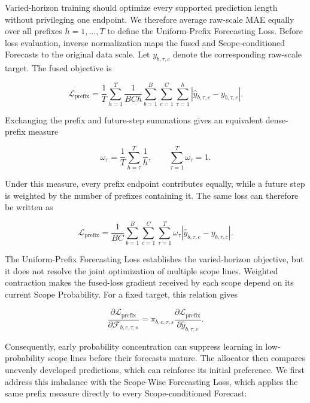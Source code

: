 \documentclass[final,3p,times]{elsarticle}
\begin{document}
Varied-horizon training should optimize every supported prediction length without privileging one endpoint. We therefore average raw-scale MAE equally over all prefixes $h=1,\ldots,T$ to define the Uniform-Prefix Forecasting Loss. Before loss evaluation, inverse normalization maps the fused and Scope-conditioned Forecasts to the original data scale. Let $y_{b,\tau,c}$ denote the corresponding raw-scale target. The fused objective is

\begin{equation}
\mathcal L_{\mathrm{prefix}}
=
\frac{1}{T}
\sum_{h=1}^{T}
\frac{1}{BCh}
\sum_{b=1}^{B}
\sum_{c=1}^{C}
\sum_{\tau=1}^{h}
\left|
\widehat y_{b,\tau,c}-y_{b,\tau,c}
\right|.
\end{equation}


Exchanging the prefix and future-step summations gives an equivalent dense-prefix measure

\begin{equation}
\omega_\tau
=
\frac{1}{T}
\sum_{h=\tau}^{T}
\frac{1}{h},
\qquad
\sum_{\tau=1}^{T}\omega_\tau=1.
\end{equation}


Under this measure, every prefix endpoint contributes equally, while a future step is weighted by the number of prefixes containing it. The same loss can therefore be written as

\begin{equation}
\mathcal L_{\mathrm{prefix}}
=
\frac{1}{BC}
\sum_{b=1}^{B}
\sum_{c=1}^{C}
\sum_{\tau=1}^{T}
\omega_\tau
\left|
\widehat y_{b,\tau,c}-y_{b,\tau,c}
\right|.
\end{equation}


The Uniform-Prefix Forecasting Loss establishes the varied-horizon objective, but it does not resolve the joint optimization of multiple scope lines. Weighted contraction makes the fused-loss gradient received by each scope depend on its current Scope Probability. For a fixed target, this relation gives

\begin{equation}
\frac{
\partial\mathcal L_{\mathrm{prefix}}
}{
\partial\mathcal F_{b,c,\tau,s}
}
=
\pi_{b,c,\tau,s}
\frac{
\partial\mathcal L_{\mathrm{prefix}}
}{
\partial\widehat y_{b,\tau,c}
}.
\end{equation}


Consequently, early probability concentration can suppress learning in low-probability scope lines before their forecasts mature. The allocator then compares unevenly developed predictions, which can reinforce its initial preference. We first address this imbalance with the Scope-Wise Forecasting Loss, which applies the same prefix measure directly to every Scope-conditioned Forecast:
\end{document}
